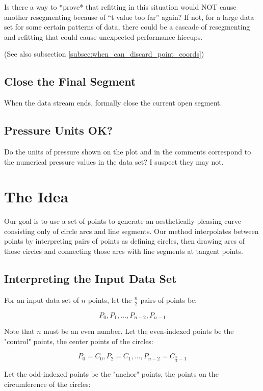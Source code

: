 \documentclass{article}
\begin{document}
Is there a way to *prove* that refitting in this situation would NOT cause another resegmenting because of “t value too far” again? If not, for a large data set for some certain patterns of data, there could be a cascade of resegmenting and refitting that could cause unexpected performance hiccups.

(See also subsection \ref{subsec:when_can_discard_point_coords})

\subsection{Close the Final Segment}
When the data stream ends, formally close the current open segment.

\subsection{Pressure Units OK?}
Do the units of pressure shown on the plot and in the comments correspond to the numerical pressure values in the data set? I suspect they may not.

\newpage
\newpage
\mbox{} %


\section{The Idea}
\label{sec:the_idea}
Our goal is to use a set of points to generate an aesthetically pleasing curve consisting only of circle arcs and line segments. Our method interpolates between points by interpreting pairs of points as defining circles, then drawing arcs of those circles and connecting those arcs with line segments at tangent points.

\subsection{Interpreting the Input Data Set}
For an input data set of \( n \) points, let the \( \frac{n}{2} \) pairs of points be:

\[ P_0, P_1, \ldots, P_{n-2}, P_{n-1} \]

Note that \( n \) must be an even number. Let the even-indexed points be the "control" points, the center points of the circles:

\[ P_0 = C_0, P_2 = C_1, \ldots, P_{n-2} = C_{\frac{n}{2}-1} \]

Let the odd-indexed points be the "anchor" points, the points on the circumference of the circles:
\end{document}
